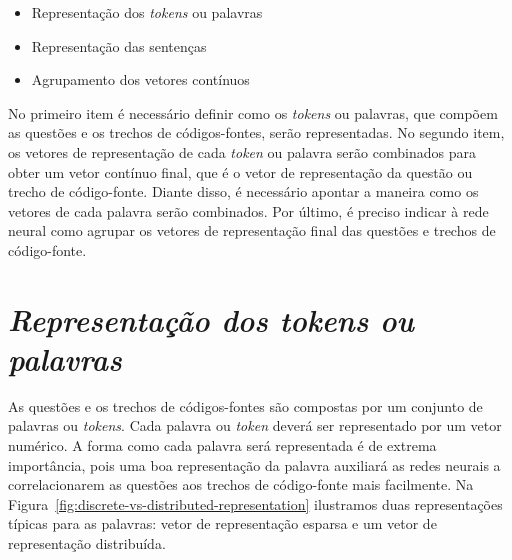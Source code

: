 \begin{itemize}
    \item Representação dos \textit{tokens} ou palavras
    \item Representação das sentenças
    \item Agrupamento dos vetores contínuos 
\end{itemize}


No primeiro item é necessário definir como os \textit{tokens} ou palavras, que compõem as questões e os trechos de códigos-fontes, serão representadas. No segundo item, os vetores de representação de cada \textit{token} ou palavra serão combinados para obter um vetor contínuo final, que é o vetor de representação da questão ou trecho de código-fonte. Diante disso, é necessário apontar a maneira como os vetores de cada palavra serão combinados. Por último, é preciso indicar à rede neural como agrupar os vetores de representação final das questões e trechos de código-fonte.


\section{\textit{Representação dos \textit{tokens} ou palavras}}
\label{sec:fundamentao-representacao-tokens-palavras}

As questões e os trechos de códigos-fontes são compostas por um conjunto de palavras ou \textit{tokens}. Cada palavra ou \textit{token} deverá ser representado por um vetor numérico. A forma como cada palavra será representada é de extrema importância, pois uma boa representação da palavra auxiliará as redes neurais a correlacionarem as questões aos trechos de código-fonte mais facilmente. Na Figura~\ref{fig:discrete-vs-distributed-representation} ilustramos duas representações típicas para as palavras: vetor de representação esparsa e um vetor de representação distribuída.


